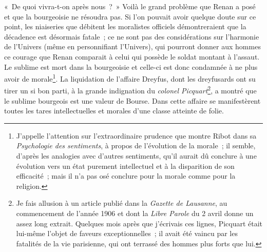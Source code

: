 \documentclass[french,twoside]{book} %
\begin{document}
« De quoi vivra-t-on après nous ? » Voilà le grand problème que Renan a posé et que la bourgeoisie ne résoudra pas. Si l’on pouvait avoir quelque doute sur ce point, les niaiseries que débitent les moralistes officiels démontreraient que la décadence est désormais fatale ; ce ne sont pas des considérations sur l’harmonie de l’Univers (même en personnifiant l’Univers), qui pourront donner aux hommes ce courage que Renan comparait à celui qui possède le soldat montant à l’assaut. Le sublime est mort dans la bourgeoisie et celle-ci est donc condamnée  à ne plus avoir de morale\footnote{ \noindent J’appelle l’attention sur l’extraordinaire prudence que montre Ribot dans sa \emph{Psychologie des sentiments}, à propos de l’évolution de la morale ; il semble, d’après les analogies avec d’autres sentiments, qu’il aurait dû conclure à une évolution vers un état purement intellectuel et à la disparition de son efficacité ; mais il n’a pas osé conclure pour la morale comme pour la religion.
 }. La liquidation de l’affaire Dreyfus, dont les dreyfusards ont su tirer un si bon parti, à la grande indignation du \emph{colonel Picquart}\footnote{ \noindent Je fais allusion à un article publié dans la \emph{Gazette de Lausanne}, au commencement de l’année 1906 et dont la \emph{Libre Parole} du 2 avril donne un assez long extrait. Quelques mois après que j’écrivais ces lignes, Picquart était lui-même l’objet de faveurs exceptionnelles ; il avait été vaincu par les fatalités de la vie parisienne, qui ont terrassé des hommes plus forts que lui.
 }, a montré que le sublime bourgeois est une valeur de Bourse. Dans cette affaire se manifestèrent toutes les tares intellectuelles et morales d’une classe atteinte de folie.
\end{document}
